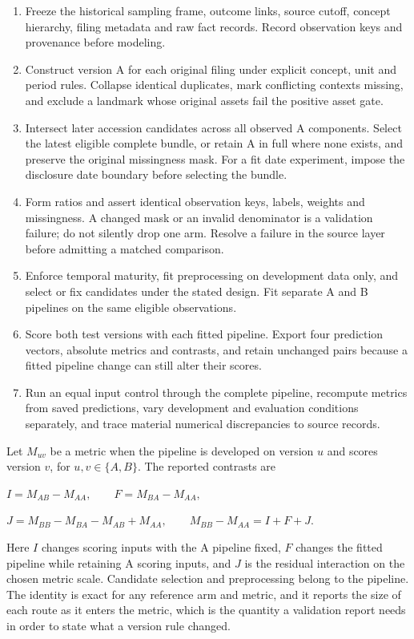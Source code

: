 \documentclass[10pt,a4paper,twocolumn]{article}
\begin{document}
\begin{enumerate}
\item Freeze the historical sampling frame, outcome links, source cutoff, concept hierarchy, filing metadata and raw fact records. Record observation keys and provenance before modeling.
\item Construct version A for each original filing under explicit concept, unit and period rules. Collapse identical duplicates, mark conflicting contexts missing, and exclude a landmark whose original assets fail the positive asset gate.
\item Intersect later accession candidates across all observed A components. Select the latest eligible complete bundle, or retain A in full where none exists, and preserve the original missingness mask. For a fit date experiment, impose the disclosure date boundary before selecting the bundle.
\item Form ratios and assert identical observation keys, labels, weights and missingness. A changed mask or an invalid denominator is a validation failure; do not silently drop one arm. Resolve a failure in the source layer before admitting a matched comparison.
\item Enforce temporal maturity, fit preprocessing on development data only, and select or fix candidates under the stated design. Fit separate A and B pipelines on the same eligible observations.
\item Score both test versions with each fitted pipeline. Export four prediction vectors, absolute metrics and contrasts, and retain unchanged pairs because a fitted pipeline change can still alter their scores.
\item Run an equal input control through the complete pipeline, recompute metrics from saved predictions, vary development and evaluation conditions separately, and trace material numerical discrepancies to source records.
\end{enumerate}

Let $M_{uv}$ be a metric when the pipeline is developed on version $u$ and scores version $v$, for $u,v\in\{A,B\}$. The reported contrasts are

$I=M_{AB}-M_{AA},\qquad F=M_{BA}-M_{AA},$

$J=M_{BB}-M_{BA}-M_{AB}+M_{AA},\qquad M_{BB}-M_{AA}=I+F+J.$

Here $I$ changes scoring inputs with the A pipeline fixed, $F$ changes the fitted pipeline while retaining A scoring inputs, and $J$ is the residual interaction on the chosen metric scale. Candidate selection and preprocessing belong to the pipeline. The identity is exact for any reference arm and metric, and it reports the size of each route as it enters the metric, which is the quantity a validation report needs in order to state what a version rule changed.
\end{document}
